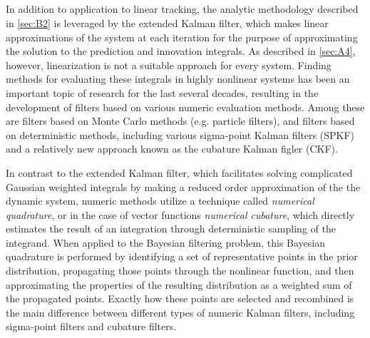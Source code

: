 \subsection{} \label{sec:B3}

In addition to application to linear tracking, the analytic methodology described in \ref{sec:B2} is leveraged by the extended Kalman filter, which makes linear approximations of the system at each iteration for the purpose of approximating the solution to the prediction and innovation integrals. As described in \ref{sec:A4}, however, linearization is not a suitable approach for every system. Finding methods for evaluating these integrals in highly nonlinear systems has been an important topic of research for the last several decades, resulting in the development of filters based on various numeric evaluation methods. Among these are filters based on Monte Carlo methods (e.g. particle filters), and filters based on deterministic methods, including various sigma-point Kalman filters (SPKF) and a relatively new approach known as the cubature Kalman figler (CKF).

In contrast to the extended Kalman filter, which facilitates solving complicated Gaussian weighted integrals by making a reduced order approximation of the the dynamic system, numeric methods utilize a technique called \emph{numerical quadrature}, or in the case of vector functions \emph{numerical cubature}, which directly estimates the result of an integration through deterministic sampling of the integrand. When applied to the Bayesian filtering problem, this Bayesian quadrature is performed by identifying a set of representative points in the prior distribution, propagating those points through the nonlinear function, and then approximating the properties of the resulting distribution as a weighted sum of the propagated points. Exactly how these points are selected and recombined is the main difference between different types of numeric Kalman filters, including sigma-point filters and cubature filters.

